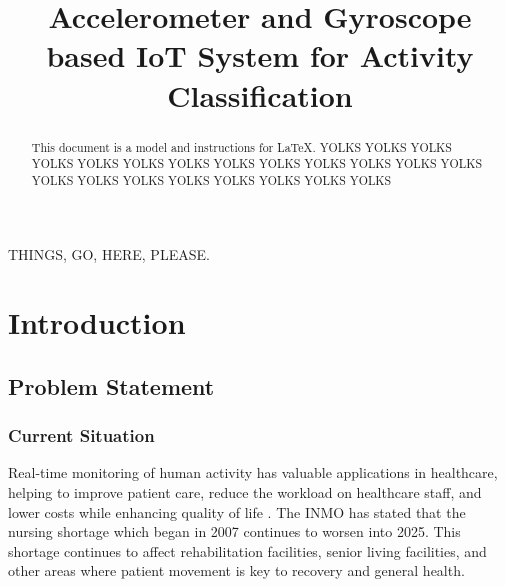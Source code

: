 \documentclass[conference]{lib/IEEEtran}
\begin{document}
\title{Accelerometer and Gyroscope based IoT System for Activity Classification\\
}

\author{
\and
{}
}

\maketitle

\begin{abstract}
This document is a model and instructions for \LaTeX.
YOLKS YOLKS YOLKS YOLKS YOLKS YOLKS YOLKS YOLKS YOLKS YOLKS YOLKS YOLKS YOLKS YOLKS YOLKS YOLKS YOLKS YOLKS YOLKS YOLKS YOLKS 
\end{abstract}

\begin{IEEEkeywords}
THINGS, GO, HERE, PLEASE.
\end{IEEEkeywords}

\section{Introduction}


\subsection{Problem Statement}

\subsubsection{Current Situation}
Real-time monitoring of human activity has valuable applications in healthcare, helping to improve patient care, reduce the workload on healthcare staff, and lower costs while enhancing quality of life \cite{b1}. The INMO has stated that the nursing shortage which began in 2007 continues to worsen into 2025. This shortage continues to affect rehabilitation facilities, senior living facilities, and other areas where patient movement is key to recovery and general health.
\end{document}
